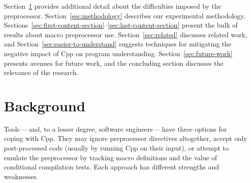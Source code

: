 \documentclass[10pt]{article}
\begin{document}
Section~\ref{sec:background} provides additional detail about the
difficulties imposed by the preprocessor.
Section~\ref{sec:methodology} describes our experimental methodology.
Sections~\ref{sec:first-content-section}--\ref{sec:last-content-section}
present the bulk of results about macro preprocessor use.
Section~\ref{sec:related} discusses related work, and
Section~\ref{sec:easier-to-understand} suggests techniques for mitigating
the negative impact of Cpp on program understanding.
Section~\ref{sec:future-work} presents avenues for future work, and the
concluding section discusses the relevance of the research.


\section{Background}\label{sec:background}

Tools\,---\,and, to a lesser degree, software engineers\,---\,have
three options for coping with Cpp.  They may ignore preprocessor
directives altogether, accept only post-processed code (usually by
running Cpp on their input), or attempt to emulate the preprocessor by
tracking macro definitions and the value of conditional compilation tests.
Each approach has different strengths and weaknesses.
\end{document}

